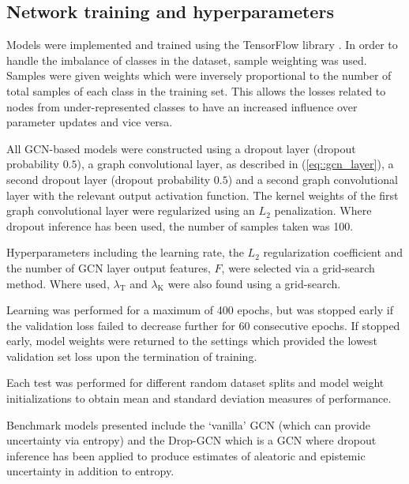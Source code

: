 \documentclass[
twocolumn,
]{ceurart}
\begin{document}
\subsection{Network training and hyperparameters}
Models were implemented and trained using the TensorFlow library \cite{Abadi2015}.
In order to handle the imbalance of classes in the dataset, sample weighting was used.
Samples were given weights which were inversely proportional to the number of total samples of each class in the training set.
This allows the losses related to nodes from under-represented classes to have an increased influence over parameter updates and vice versa.

All GCN-based models were constructed using a dropout layer (dropout probability $0.5$), a graph convolutional layer, as described in (\ref{eq::gcn_layer}), a second dropout layer (dropout probability $0.5$) and a second graph convolutional layer with the relevant output activation function.
The kernel weights of the first graph convolutional layer were regularized using an $L_2$ penalization.
Where dropout inference has been used, the number of samples taken was 100.

Hyperparameters including the learning rate, the $L_2$ regularization coefficient and the number of GCN layer output features, $F$, were selected via a grid-search method.
Where used, $\lambda_{\text{T}}$ and $\lambda_{\text{K}}$ were also found using a grid-search.

Learning was performed for a maximum of 400 epochs, but was stopped early if the validation loss failed to decrease further for 60 consecutive epochs.
If stopped early, model weights were returned to the settings which provided the lowest validation set loss upon the termination of training.

Each test was performed for different random dataset splits and model weight initializations to obtain mean and standard deviation measures of performance.

Benchmark models presented include the `vanilla' GCN (which can provide uncertainty via entropy) and the Drop-GCN which is a GCN where dropout inference has been applied to produce estimates of aleatoric and epistemic uncertainty in addition to entropy.
\end{document}
